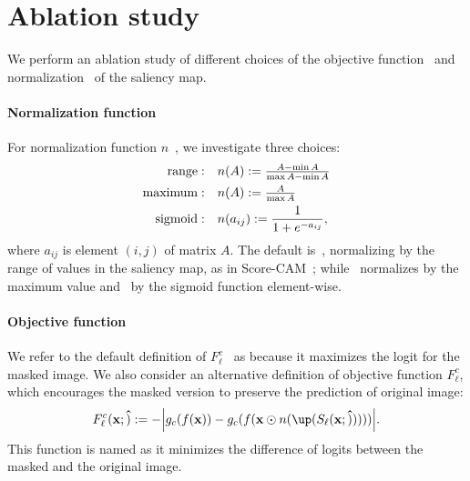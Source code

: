 \section{Ablation study}
\label{sec:ablation}

We perform an ablation study of different choices of the objective function~ and 
normalization~ of the saliency map. %

\paragraph{Normalization function}
For normalization function $n$~, we investigate three choices:
\begin{align}
	\textrm{range}: \quad & n(A) \mathrel{:=} \textstyle \frac{A-\min A}{\max A-\min A}\label{eq:n-rng}\\
	\textrm{maximum}: \quad & n(A) \mathrel{:=} \textstyle \frac{A}{\max A}\label{eq:n-max}\\
 	\textrm{sigmoid}: \quad & n(a_{ij}) \mathrel{:=} \frac{1}{1+e^{-a_{ij}}}\label{eq:n-sig},
\end{align}
where $a_{ij}$ is element $(i,j)$ of matrix $A$. The default is~, normalizing by the 
range of values in the saliency map, as in Score-CAM~; while~ normalizes by the 
maximum value and~ by the sigmoid function element-wise.


\paragraph{Objective function}

We refer to the default definition of $F^c_\ell$~ as \Fdef because it maximizes the logit 
for the masked image.
We also consider an alternative definition of objective function $F^c_\ell$, which encourages the 
masked version to preserve the prediction of original image:
\begin{equation}
	F^c_\ell(\vx; \vu) \defn -\abs{g_c(f(\vx)) - g_c(f(\vx \odot n(\up(S_\ell(\vx; \vu)))))}.
\label{eq:ref}
\end{equation}
This function is named \Fref as it minimizes the difference of logits between the masked and the 
original image.

